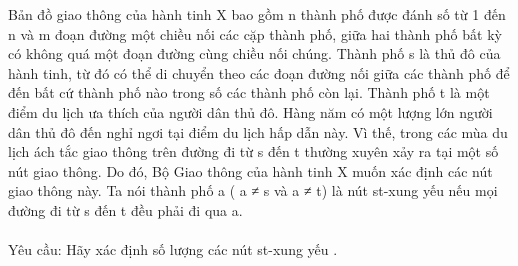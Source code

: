 Bản đồ giao thông của hành tinh X bao gồm n thành phố được đánh số từ 1 đến n và m đoạn đường một chiều nối các cặp thành phố, giữa hai thành phố bất kỳ có không quá một đoạn đường cùng chiều nối chúng. Thành phố s là thủ đô của hành tinh, từ đó có thể di chuyển theo các đoạn đường nối giữa các thành phố để đến bất cứ thành phố nào trong số các thành phố còn lại. Thành phố t là một điểm du lịch ưa thích của người dân thủ đô. Hàng năm có một lượng lớn người dân thủ đô đến nghỉ ngơi tại điểm du lịch hấp dẫn này. Vì thế, trong các mùa du lịch ách tắc giao thông trên đường đi từ s đến t thường xuyên xảy ra tại một số nút giao thông. Do đó, Bộ Giao thông của hành tinh X muốn xác định các nút giao thông này. Ta nói thành phố a ( a ≠ s và a ≠ t) là nút st-xung yếu nếu mọi đường đi từ s đến t đều phải đi qua a.
\\
\\Yêu cầu: Hãy xác định số lượng các nút st-xung yếu .